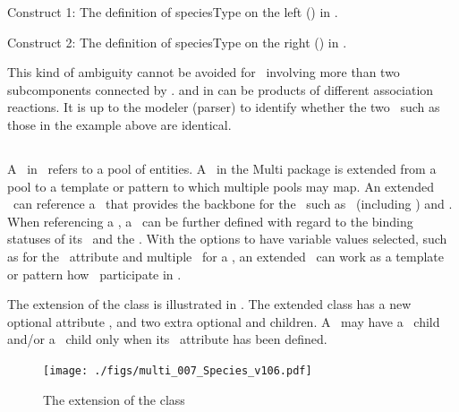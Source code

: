 Construct 1: The definition of speciesType  on the left () in .

Construct 2: The definition of speciesType  on the right () in .

This kind of ambiguity cannot be avoided for \speciesTypes\ involving more than two subcomponents connected by \inSpeciesTypeBonds.  and  in  can be products of different association reactions. It is up to the modeler (parser) to identify whether the two \speciesTypes\ such as those in the example above are identical.

\clearpage

\subsection{}
\label{def:ExSpecies}

A \species\ in \SbmlLevelThreeCore\ refers to a pool of entities. A \species\ in the Multi package is extended from a pool to a template or pattern to which multiple pools may map. An extended \species\ can reference a \speciesType\ that provides the backbone for the \species\ such as \components\ (including \bindingSites) and \speciesFeatureTypes. When referencing a \speciesType, a \species\ can be further defined with regard to the binding statuses of its \outwardBindingSites\ and the \speciesFeatures. With the options to have variable values selected, such as  for the \bindingStatusAtt\ attribute and multiple \possibleSpeciesFeatureValues\ for a \speciesFeature, an extended \species\ can work as a template or pattern how \species\ participate in \reactions.  

The extension of the \Species class is illustrated in . The extended \ExSpecies class has a new optional attribute \speciesTypeAtt, and two extra optional \ListOfOutwardBindingSites and \ListOfSpeciesFeatures children. A \species\ may have a \listOfOutwardBindingSites\ child and/or a \listOfSpeciesFeatures\ child only when its \speciesTypeAtt\ attribute has been defined.

\begin{figure}[htb]
  \begin{center}
    \texttt{[image: ./figs/multi\_007\_Species\_v106.pdf]}
    \caption{The extension of the \ExSpecies class}
  \label{fig:ExSpecies}
  \end{center}
\end{figure}

